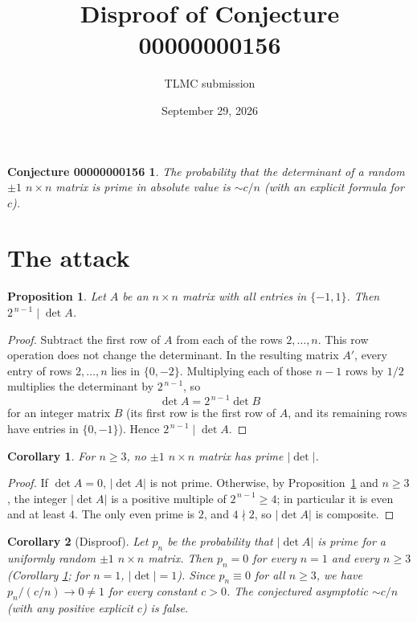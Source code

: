 \documentclass[11pt]{article}
\title{Disproof of Conjecture 00000000156}
\author{TLMC submission}
\date{September 29, 2026}
\newtheorem*{claim}{Conjecture 00000000156}
\newtheorem{prop}{Proposition}
\newtheorem{cor}{Corollary}
\begin{document}
\maketitle

\begin{claim}
The probability that the determinant of a random $\pm 1$ $n\times n$ matrix is prime in
absolute value is $\sim c/n$ (with an explicit formula for $c$).
\end{claim}

\begin{center}\end{center}

\section{The attack}

\begin{prop}\label{prop:div}
Let $A$ be an $n\times n$ matrix with all entries in $\{-1,1\}$. Then
$2^{\,n-1}\mid \det A$.
\end{prop}

\begin{proof}
Subtract the first row of $A$ from each of the rows $2,\dots,n$. This row operation does
not change the determinant. In the resulting matrix $A'$, every entry of rows
$2,\dots,n$ lies in $\{0,-2\}$. Multiplying each of those $n-1$ rows by $1/2$ multiplies
the determinant by $2^{\,n-1}$, so
\[
\det A = 2^{\,n-1}\det B
\]
for an integer matrix $B$ (its first row is the first row of $A$, and its remaining rows
have entries in $\{0,-1\}$). Hence $2^{\,n-1}\mid \det A$.
\end{proof}

\begin{cor}\label{cor:noprime}
For $n\ge 3$, no $\pm 1$ $n\times n$ matrix has prime $|\det|$.
\end{cor}

\begin{proof}
If $\det A=0$, $|\det A|$ is not prime. Otherwise, by Proposition~\ref{prop:div} and
$n\ge 3$, the integer $|\det A|$ is a positive multiple of $2^{\,n-1}\ge 4$; in
particular it is even and at least $4$. The only even prime is $2$, and $4\nmid 2$, so
$|\det A|$ is composite.
\end{proof}

\begin{cor}[Disproof]\label{cor:main}
Let $p_n$ be the probability that $|\det A|$ is prime for a uniformly random $\pm 1$
$n\times n$ matrix. Then $p_n=0$ for every $n=1$ and every $n\ge 3$ (Corollary
\ref{cor:noprime}; for $n=1$, $|\det|=1$). Since $p_n\equiv 0$ for all $n\ge 3$, we have
$p_n/(c/n)\to 0\ne 1$ for every constant $c>0$. The conjectured asymptotic $\sim c/n$
(with any positive explicit $c$) is false.
\end{cor}
\end{document}
